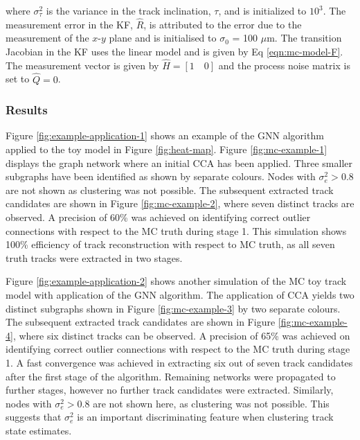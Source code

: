 where $\sigma_{\tau}^2$ is the variance in the track inclination, $\tau$, and is initialized to $10^3$. The measurement error in the KF, $\hat{R}$, is attributed to the error due to the measurement of the $x$-$y$ plane and is initialised to $\sigma_{0}$ = 100 $\mu$m. The transition Jacobian in the KF uses the linear model and is given by Eq \eqref{eqn:mc-model-F}. The measurement vector is given by $\hat{H} = [1 \quad 0]$ and the process noise matrix is set to $\hat{Q} = 0$.



\subsubsection{Results}

Figure \ref{fig:example-application-1} shows an example of the GNN algorithm applied to the toy model in Figure \ref{fig:heat-map}. Figure \ref{fig:mc-example-1} displays the graph network where an initial CCA has been applied. Three smaller subgraphs have been identified as shown by separate colours. Nodes with $\sigma_e^2 > 0.8$ are not shown as clustering was not possible. The subsequent extracted track candidates are shown in Figure \ref{fig:mc-example-2}, where seven distinct tracks are observed. A precision of 60\% was achieved on identifying correct outlier connections with respect to the MC truth during stage 1. This simulation shows 100\% efficiency of track reconstruction with respect to MC truth, as all seven truth tracks were extracted in two stages. 

Figure \ref{fig:example-application-2} shows another simulation of the MC toy track model with application of the GNN algorithm. The application of CCA yields two distinct subgraphs shown in Figure \ref{fig:mc-example-3} by two separate colours. The subsequent extracted track candidates are shown in Figure \ref{fig:mc-example-4}, where six distinct tracks can be observed. A precision of 65\% was achieved on identifying correct outlier connections with respect to the MC truth during stage 1. A fast convergence was achieved in extracting six out of seven track candidates after the first stage of the algorithm. Remaining networks were propagated to further stages, however no further track candidates were extracted. Similarly, nodes with $\sigma_e^2 > 0.8$ are not shown here, as clustering was not possible. This suggests that $\sigma_{e}^{2}$ is an important discriminating feature when clustering track state estimates. 

